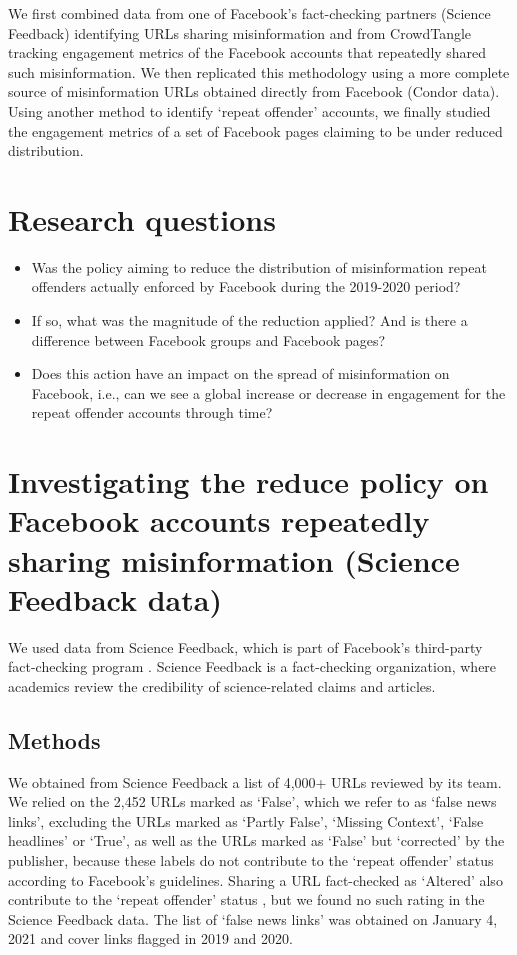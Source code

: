 \documentclass[review]{elsarticle}
\begin{document}
We first combined data from one of Facebook's fact-checking partners (Science Feedback) identifying URLs sharing misinformation and from CrowdTangle tracking engagement metrics of the Facebook accounts that repeatedly shared such misinformation.
We then replicated this methodology using a more complete source of misinformation URLs obtained directly from Facebook (Condor data).
Using another method to identify `repeat offender' accounts, we finally studied the engagement metrics of a set of Facebook pages claiming to be under reduced distribution.


\section{Research questions}

\begin{itemize}
\item Was the policy aiming to reduce the distribution of misinformation repeat offenders actually enforced by Facebook during the 2019-2020 period?
\item If so, what was the magnitude of the reduction applied? And is there a difference between Facebook groups and Facebook pages?
\item Does this action have an impact on the spread of misinformation on Facebook, i.e., can we see a global increase or decrease in engagement for the repeat offender accounts through time?
\end{itemize}

\section{Investigating the reduce policy on Facebook accounts repeatedly sharing misinformation (Science Feedback data)}

We used data from Science Feedback, which is part of Facebook’s third-party fact-checking program \cite{sciencefeedbackFbPartner}. 
Science Feedback is a fact-checking organization, where academics review the credibility of science-related claims and articles.

\subsection{Methods}

We obtained from Science Feedback a list of 4,000+ URLs reviewed by its team. 
We relied on the 2,452 URLs marked as `False', which we refer to as `false news links', excluding the URLs marked as `Partly False', `Missing Context', `False headlines' or `True', as well as the URLs marked as `False' but `corrected' by the publisher, because these labels do not contribute to the `repeat offender' status according to Facebook's guidelines.
Sharing a URL fact-checked as `Altered' also contribute to the `repeat offender' status \citep{factCheckingRules, repeatOffenderCommunication}, but we found no such rating in the Science Feedback data.
The list of `false news links' was obtained on January 4, 2021 and cover links flagged in 2019 and 2020.
\end{document}

